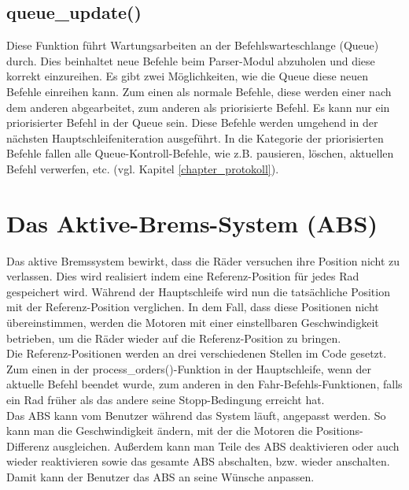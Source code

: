 \subsection{queue\_update()\label{chapter_queue_update}}
Diese Funktion führt Wartungsarbeiten an der Befehlswarteschlange (Queue) durch. Dies beinhaltet neue
Befehle beim Parser-Modul abzuholen und diese korrekt einzureihen. Es gibt zwei Möglichkeiten, wie die Queue
diese neuen Befehle einreihen kann. Zum einen als normale Befehle, diese werden einer nach dem anderen abgearbeitet,
zum anderen als priorisierte Befehl. Es kann nur ein priorisierter Befehl in der Queue sein. Diese Befehle werden
umgehend in der nächsten Haupt\-schleifen\-iteration ausgeführt. In die Kategorie der priorisierten Befehle fallen
alle Queue-Kontroll-Befehle, wie z.B. pausieren, löschen, aktuellen Befehl verwerfen, etc. (vgl. Kapitel \ref{chapter_protokoll}).
\section{Das Aktive-Brems-System (ABS)\label{chapter_abs}}
Das aktive Bremssystem bewirkt, dass die Räder versuchen ihre Position nicht zu verlassen. Dies wird realisiert indem
eine Referenz-Position für jedes Rad gespeichert wird. Während der Hauptschleife wird nun die tatsächliche Position mit
der Referenz-Position verglichen. In dem Fall, dass diese Positionen nicht übereinstimmen, werden die Motoren mit einer
einstellbaren Geschwindigkeit betrieben, um die Räder wieder auf die Referenz-Position zu bringen.\\
Die Referenz-Positionen werden an drei verschiedenen Stellen im Code gesetzt. Zum einen in der process\_\-orders()-Funktion
in der Hauptschleife, wenn der aktuelle Befehl beendet wurde, zum anderen in den Fahr-Befehls-Funktionen, falls ein Rad
früher als das andere seine Stopp-Bedingung erreicht hat.\\
Das ABS kann vom Benutzer während das System läuft, angepasst werden. So kann man die Geschwindigkeit ändern, mit der
die Motoren die Positions-Differenz ausgleichen. Außerdem kann man Teile des ABS deaktivieren oder auch wieder reaktivieren
sowie das gesamte ABS abschalten, bzw. wieder anschalten. Damit kann der Benutzer das ABS an seine Wünsche anpassen.
